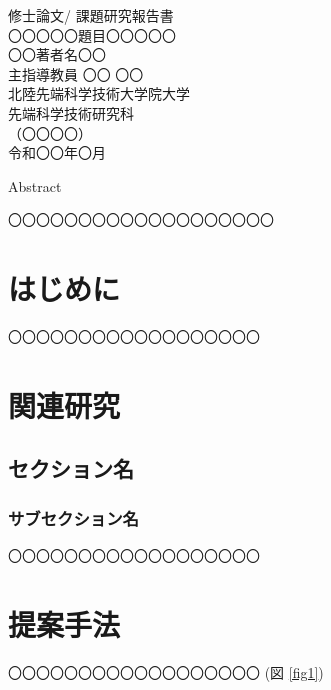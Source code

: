 \documentclass[12pt,a4j]{jreport}
\begin{document}
\thispagestyle{empty}
\begin{center}
修士論文/ 課題研究報告書\\%
\vfill
〇〇〇〇〇題目〇〇〇〇〇\\
\vfill
〇〇著者名〇〇\\
\vfill
主指導教員  〇〇 〇〇\\
\vfill
北陸先端科学技術大学院大学\\
先端科学技術研究科\\
（〇〇〇〇）\\ %
\vfill
令和〇〇年〇月\\ %
\vfill
\end{center}

\clearpage
\thispagestyle{plain}

\centerline{Abstract}
〇〇〇〇〇〇〇〇〇〇〇〇〇〇〇〇〇〇〇
\clearpage

\tableofcontents
\clearpage

\listoffigures
\clearpage
\listoftables
\clearpage

\setcounter{page}{1}

\chapter{はじめに}
〇〇〇〇〇〇〇〇〇〇〇〇〇〇〇〇〇〇\cite{ref1,ref2}

\chapter{関連研究}
\section{セクション名}
\subsection{サブセクション名}
〇〇〇〇〇〇〇〇〇〇〇〇〇〇〇〇〇〇

\chapter{提案手法}
〇〇〇〇〇〇〇〇〇〇〇〇〇〇〇〇〇〇 (図 \ref{fig1})
\end{document}
